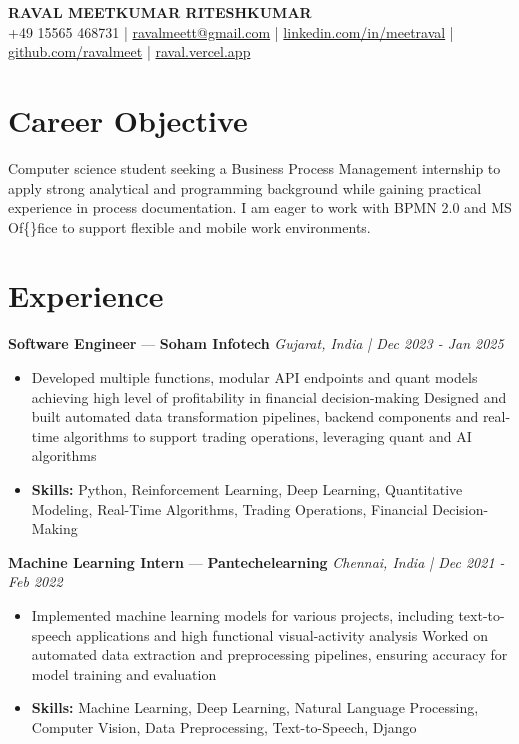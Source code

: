 \documentclass[a4paper,10pt]{article}
\begin{document}
\begin{center}
  {\Large\bfseries RAVAL MEETKUMAR RITESHKUMAR}\\[2pt]
  {\small +49 15565 468731 \;|\; \href{mailto:ravalmeett@gmail.com}{ravalmeett@gmail.com} \;|\; \href{https://www.linkedin.com/in/meetraval/}{linkedin.com/in/meetraval} \;|\; \href{https://github.com/ravalmeet}{github.com/ravalmeet} \;|\; \href{https://raval.vercel.app/}{raval.vercel.app}}
\end{center}
\vspace{-3pt}

\section*{Career Objective}
Computer science student seeking a Business Process Management internship to apply strong analytical and programming background while gaining practical experience in process documentation. I am eager to work with BPMN 2.0 and MS Of\{\}fice to support flexible and mobile work environments.\par

\section*{Experience}
\textbf{Software Engineer} — \textbf{Soham Infotech} \hfill \textit{Gujarat, India \;|\; Dec 2023 - Jan 2025}\par
\vspace{1pt}
\begin{itemize}
  \item Developed multiple functions, modular API endpoints and quant models achieving high level of profitability in financial decision-making Designed and built automated data transformation pipelines, backend components and real-time algorithms to support trading operations, leveraging quant and AI algorithms
  \item \textbf{Skills:} Python, Reinforcement Learning, Deep Learning, Quantitative Modeling, Real-Time Algorithms, Trading Operations, Financial Decision-Making
\end{itemize}
\vspace{3pt}
\textbf{Machine Learning Intern} — \textbf{Pantechelearning} \hfill \textit{Chennai, India \;|\; Dec 2021 - Feb 2022}\par
\vspace{1pt}
\begin{itemize}
  \item Implemented machine learning models for various projects, including text-to-speech applications and high functional visual-activity analysis Worked on automated data extraction and preprocessing pipelines, ensuring accuracy for model training and evaluation
  \item \textbf{Skills:} Machine Learning, Deep Learning, Natural Language Processing, Computer Vision, Data Preprocessing, Text-to-Speech, Django
\end{itemize}
\end{document}
